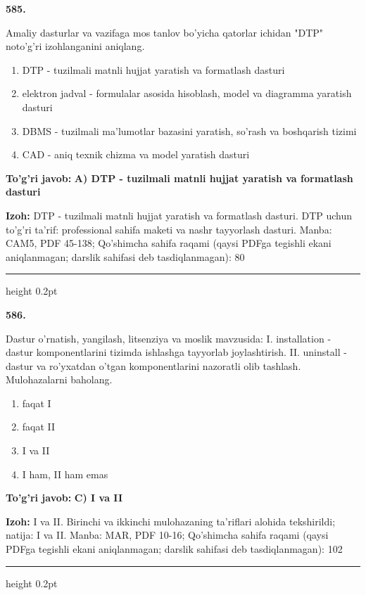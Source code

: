 \documentclass[10pt,a4paper]{article}
\begin{document}
{\bfseries\sffamily\color{ink} 585.}
\par
Amaliy dasturlar va vazifaga mos tanlov bo'yicha qatorlar ichidan "DTP" noto'g'ri izohlanganini aniqlang.
\begin{enumerate}[label=\Alph*),leftmargin=9mm]
\item DTP - tuzilmali matnli hujjat yaratish va formatlash dasturi
\item elektron jadval - formulalar asosida hisoblash, model va diagramma yaratish dasturi
\item DBMS - tuzilmali ma'lumotlar bazasini yaratish, so'rash va boshqarish tizimi
\item CAD - aniq texnik chizma va model yaratish dasturi
\end{enumerate}
\begin{tcolorbox}[enhanced,breakable,colback=teal!4,colframe=teal!60!black,boxrule=0.45pt,arc=1.2mm,left=2.7mm,right=2.7mm,top=1.8mm,bottom=1.8mm,before skip=2mm,after skip=2mm]
{\bfseries\sffamily\color{teal}To'g'ri javob:} \textbf{A) DTP - tuzilmali matnli hujjat yaratish va formatlash dasturi}
\par\smallskip
{\bfseries Izoh:} DTP - tuzilmali matnli hujjat yaratish va formatlash dasturi. DTP uchun to'g'ri ta'rif: professional sahifa maketi va nashr tayyorlash dasturi. Manba: CAM5, PDF 45-138; Qo'shimcha sahifa raqami (qaysi PDFga tegishli ekani aniqlanmagan; darslik sahifasi deb tasdiqlanmagan): 80
\end{tcolorbox}
\vspace{2mm}\hrule height 0.2pt\vspace{3mm}

{\bfseries\sffamily\color{ink} 586.}
\par
Dastur o'rnatish, yangilash, litsenziya va moslik mavzusida: I. installation - dastur komponentlarini tizimda ishlashga tayyorlab joylashtirish. II. uninstall - dastur va ro'yxatdan o'tgan komponentlarini nazoratli olib tashlash. Mulohazalarni baholang.
\begin{enumerate}[label=\Alph*),leftmargin=9mm]
\item faqat I
\item faqat II
\item I va II
\item I ham, II ham emas
\end{enumerate}
\begin{tcolorbox}[enhanced,breakable,colback=teal!4,colframe=teal!60!black,boxrule=0.45pt,arc=1.2mm,left=2.7mm,right=2.7mm,top=1.8mm,bottom=1.8mm,before skip=2mm,after skip=2mm]
{\bfseries\sffamily\color{teal}To'g'ri javob:} \textbf{C) I va II}
\par\smallskip
{\bfseries Izoh:} I va II. Birinchi va ikkinchi mulohazaning ta'riflari alohida tekshirildi; natija: I va II. Manba: MAR, PDF 10-16; Qo'shimcha sahifa raqami (qaysi PDFga tegishli ekani aniqlanmagan; darslik sahifasi deb tasdiqlanmagan): 102
\end{tcolorbox}
\vspace{2mm}\hrule height 0.2pt\vspace{3mm}
\end{document}
